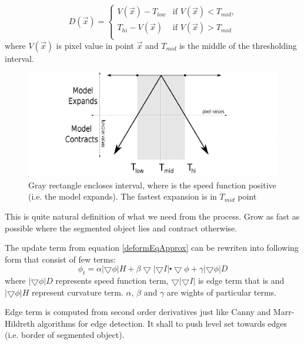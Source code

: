 \begin{equation}
D(\vec{x}) = 
\begin{cases}
V(\vec{x}) - T_{low} & \text{if $V(\vec{x}) < T_{mid}$,}\\
T_{hi} - V(\vec{x}) & \text{if $V(\vec{x}) > T_{mid}$}\\
\end{cases}
\end{equation}
where $V(\vec{x})$ is pixel value in point $\vec{x}$ and $T_{mid}$ is the middle of the thresholding interval.

\begin{figure}
    \centering
    \includegraphics[width=14cm]{data/speedFunction.eps}
    \caption[Graph of thresholding based speed function]{Gray rectangle encloses interval, where is the speed function positive (i.e. the model expands). The fastest expansion is in $T_{mid}$ point}
    \label{fg:speedFunction}
\end{figure}

This is quite natural definition of what we need from the process. Grow as fast as possible where the segmented object lies and contract otherwise.

The update term from equation \ref{deformEqApprox} can be rewriten into following form that consist of few terms:
\begin{equation}
\phi_t = \alpha |\bigtriangledown \phi| H + \beta \bigtriangledown|\bigtriangledown I|\centerdot \bigtriangledown \phi + \gamma|\bigtriangledown \phi|D
\end{equation}
where $|\bigtriangledown \phi|D$ represents speed function term, $\bigtriangledown|\bigtriangledown I|$ is edge term that is and $|\bigtriangledown \phi| H$ represent curvature term. $\alpha$, $\beta$ and $\gamma$ are wights of particular terms.

Edge term is computed from second order derivatives just like Canny and Marr-Hildreth algorithms for edge detection. It shall to push level set towards edges (i.e. border of segmented object).

